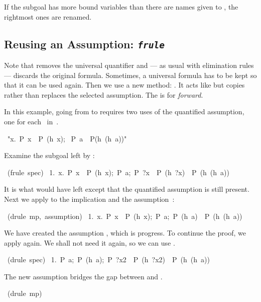 If the subgoal has more bound variables than there are names given to
, the rightmost ones are renamed.%


\subsection{Reusing an Assumption: {\tt\slshape frule}}
\label{sec:frule}

%
Note that  removes the universal quantifier and --- as
usual with elimination rules --- discards the original formula.  Sometimes, a
universal formula has to be kept so that it can be used again.  Then we use a new
method: .  It acts like  but copies rather than replaces
the selected assumption.  The  is for \emph{forward}.

In this example, going from  to 
requires two uses of the quantified assumption, one for each~
in~.
\begin{isabelle}
\ "\isasymlbrakk{\isasymforall}x.\ P\ x\ \isasymlongrightarrow\ P\ (h\ x);
\ P\ a\isasymrbrakk\ \isasymLongrightarrow\ P(h\ (h\ a))"
\end{isabelle}
%
Examine the subgoal left by :
\begin{isabelle}
\ (frule\ spec)\isanewline
\ 1.\ \isasymlbrakk{\isasymforall}x.\ P\ x\ \isasymlongrightarrow\ P\ (h\ x);\ P\ a;\ P\ ?x\ \isasymlongrightarrow\ P\ (h\ ?x)\isasymrbrakk\ \isasymLongrightarrow\ P\ (h\ (h\ a))
\end{isabelle}
It is what  would have left except that the quantified
assumption is still present.  Next we apply  to the
implication and the assumption~:
\begin{isabelle}
\ (drule\ mp,\ assumption)\isanewline
\ 1.\ \isasymlbrakk{\isasymforall}x.\ P\ x\ \isasymlongrightarrow\ P\ (h\ x);\ P\ a;\ P\ (h\ a)\isasymrbrakk\ \isasymLongrightarrow\ P\ (h\ (h\ a))
\end{isabelle}
%
We have created the assumption , which is progress.  To
continue the proof, we apply  again.  We shall not need it
again, so we can use
.
\begin{isabelle}
\ (drule\ spec)\isanewline
\ 1.\ \isasymlbrakk P\ a;\ P\ (h\ a);\ P\ ?x2\ 
\isasymlongrightarrow \ P\ (h\ ?x2)\isasymrbrakk \ \isasymLongrightarrow \
P\ (h\ (h\ a))
\end{isabelle}
%
The new assumption bridges the gap between  and .
\begin{isabelle}
\isacommand{by}\ (drule\ mp)
\end{isabelle}

